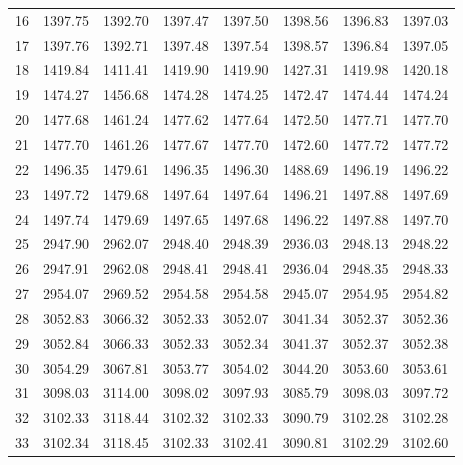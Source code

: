 \documentclass[10pt,oneside]{article}
\begin{document}
\begin{table}[h!]
\begin{tabular}{cccccccc}
16 &   1397.75 & 1392.70 & 1397.47 & 1397.50 &      1398.56 & 1396.83 & 1397.03 \\
17 &   1397.76 & 1392.71 & 1397.48 & 1397.54 &      1398.57 & 1396.84 & 1397.05 \\
18 &   1419.84 & 1411.41 & 1419.90 & 1419.90 &      1427.31 & 1419.98 & 1420.18 \\
19 &   1474.27 & 1456.68 & 1474.28 & 1474.25 &      1472.47 & 1474.44 & 1474.24 \\
20 &   1477.68 & 1461.24 & 1477.62 & 1477.64 &      1472.50 & 1477.71 & 1477.70 \\
21 &   1477.70 & 1461.26 & 1477.67 & 1477.70 &      1472.60 & 1477.72 & 1477.72 \\
22 &   1496.35 & 1479.61 & 1496.35 & 1496.30 &      1488.69 & 1496.19 & 1496.22 \\
23 &   1497.72 & 1479.68 & 1497.64 & 1497.64 &      1496.21 & 1497.88 & 1497.69 \\
24 &   1497.74 & 1479.69 & 1497.65 & 1497.68 &      1496.22 & 1497.88 & 1497.70 \\
25 &   2947.90 & 2962.07 & 2948.40 & 2948.39 &      2936.03 & 2948.13 & 2948.22 \\
26 &   2947.91 & 2962.08 & 2948.41 & 2948.41 &      2936.04 & 2948.35 & 2948.33 \\
27 &   2954.07 & 2969.52 & 2954.58 & 2954.58 &      2945.07 & 2954.95 & 2954.82 \\
28 &   3052.83 & 3066.32 & 3052.33 & 3052.07 &      3041.34 & 3052.37 & 3052.36 \\
29 &   3052.84 & 3066.33 & 3052.33 & 3052.34 &      3041.37 & 3052.37 & 3052.38 \\
30 &   3054.29 & 3067.81 & 3053.77 & 3054.02 &      3044.20 & 3053.60 & 3053.61 \\
31 &   3098.03 & 3114.00 & 3098.02 & 3097.93 &      3085.79 & 3098.03 & 3097.72 \\
32 &   3102.33 & 3118.44 & 3102.32 & 3102.33 &      3090.79 & 3102.28 & 3102.28 \\
33 &   3102.34 & 3118.45 & 3102.33 & 3102.41 &      3090.81 & 3102.29 & 3102.60 \\
\bottomrule
\end{tabular}
\end{table}

\clearpage
\end{document}
